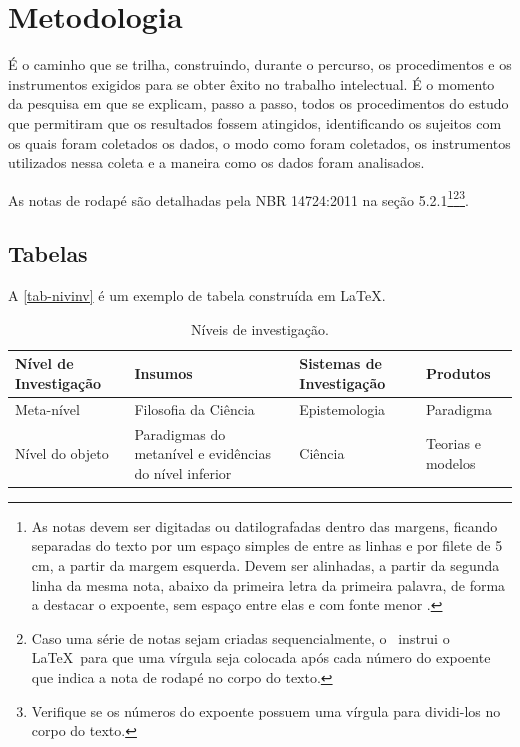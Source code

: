 \chapter{Metodologia}

É o caminho que se trilha, construindo, durante o percurso, os procedimentos e os instrumentos exigidos para se obter êxito no trabalho intelectual. É o momento da pesquisa em que se explicam, passo a passo, todos os procedimentos do estudo que permitiram que os resultados fossem atingidos, identificando os sujeitos com os quais foram coletados os dados, o modo como foram coletados, os instrumentos utilizados nessa coleta e a maneira como os dados foram analisados.

As notas de rodapé são detalhadas pela NBR 14724:2011 na seção 5.2.1\footnote{As notas devem ser digitadas ou datilografadas dentro das margens, ficando separadas do texto por um espaço simples de entre as linhas e por filete de 5 cm, a partir da margem esquerda. Devem ser alinhadas, a partir da segunda linha
da mesma nota, abaixo da primeira letra da primeira palavra, de forma a destacar o expoente, sem espaço entre elas e com fonte menor .}\footnote{Caso uma série de notas sejam criadas sequencialmente, o \abnTeX\ instrui o \LaTeX\ para que uma vírgula seja colocada após cada número do expoente que indica a nota de rodapé no corpo do texto.}\footnote{Verifique se os números do expoente possuem uma vírgula para dividi-los no corpo do texto.}. 


\section{Tabelas}

A \autoref{tab-nivinv} é um exemplo de tabela construída em
\LaTeX.

\begin{table}[htb]
\ABNTEXfontereduzida
\caption[Níveis de investigação]{Níveis de investigação.}
\label{tab-nivinv}
\begin{tabular}{p{2.6cm}|p{6.0cm}|p{2.25cm}|p{3.40cm}}
   \textbf{Nível de Investigação} & \textbf{Insumos}  & \textbf{Sistemas de Investigação}  & \textbf{Produtos}  \\
    \hline
    Meta-nível & Filosofia\index{filosofia} da Ciência  & Epistemologia &
    Paradigma  \\
    \hline
    Nível do objeto & Paradigmas do metanível e evidências do nível inferior &
    Ciência  & Teorias e modelos \\
    \hline
\end{tabular}
\end{table}

